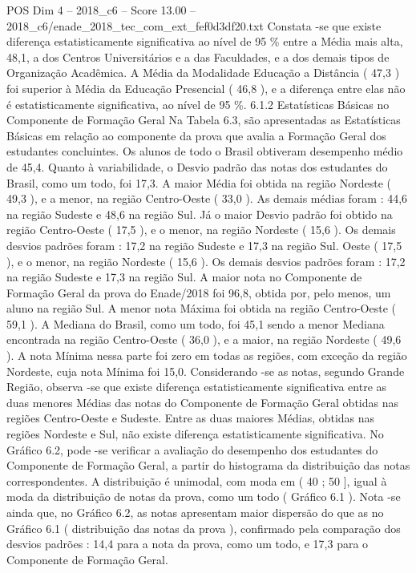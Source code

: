 \begin{textsample}{POS Dim 4 – 2018\_c6 – Score 13.00 – 2018\_c6/enade\_2018\_tec\_com\_ext\_fef0d3df20.txt}
Constata -se que existe diferença estatisticamente significativa ao nível de 95 \% entre a Média mais alta, 48,1, a dos Centros Universitários e a das Faculdades, e a dos demais tipos de Organização Acadêmica.
A Média da Modalidade Educação a Distância ( 47,3 ) foi superior à Média da Educação Presencial ( 46,8 ), e a diferença entre elas não é estatisticamente significativa, ao nível de 95 \%. 6.1.2 Estatísticas Básicas no Componente de Formação Geral Na Tabela 6.3, são apresentadas as Estatísticas Básicas em relação ao componente da prova que avalia a Formação Geral dos estudantes concluintes.
Os alunos de todo o Brasil obtiveram desempenho médio de 45,4.
Quanto à variabilidade, o Desvio padrão das notas dos estudantes do Brasil, como um todo, foi 17,3.
A maior Média foi obtida na região Nordeste ( 49,3 ), e a menor, na região Centro-Oeste ( 33,0 ).
As demais médias foram : 44,6 na região Sudeste e 48,6 na região Sul.
Já o maior Desvio padrão foi obtido na região Centro-Oeste ( 17,5 ), e o menor, na região Nordeste ( 15,6 ).
Os demais desvios padrões foram : 17,2 na região Sudeste e 17,3 na região Sul.
Oeste ( 17,5 ), e o menor, na região Nordeste ( 15,6 ).
Os demais desvios padrões foram : 17,2 na região Sudeste e 17,3 na região Sul.
A maior nota no Componente de Formação Geral da prova do Enade/2018 foi 96,8, obtida por, pelo menos, um aluno na região Sul.
A menor nota Máxima foi obtida na região Centro-Oeste ( 59,1 ).
A Mediana do Brasil, como um todo, foi 45,1 sendo a menor Mediana encontrada na região Centro-Oeste ( 36,0 ), e a maior, na região Nordeste ( 49,6 ).
A nota Mínima nessa parte foi zero em todas as regiões, com exceção da região Nordeste, cuja nota Mínima foi 15,0.
Considerando -se as notas, segundo Grande Região, observa -se que existe diferença estatisticamente significativa entre as duas menores Médias das notas do Componente de Formação Geral obtidas nas regiões Centro-Oeste e Sudeste.
Entre as duas maiores Médias, obtidas nas regiões Nordeste e Sul, não existe diferença estatisticamente significativa.
No Gráfico 6.2, pode -se verificar a avaliação do desempenho dos estudantes do Componente de Formação Geral, a partir do histograma da distribuição das notas correspondentes.
A distribuição é unimodal, com moda em ( 40 ; 50 ], igual à moda da distribuição de notas da prova, como um todo ( Gráfico 6.1 ).
Nota -se ainda que, no Gráfico 6.2, as notas apresentam maior dispersão do que as no Gráfico 6.1 ( distribuição das notas da prova ), confirmado pela comparação dos desvios padrões : 14,4 para a nota da prova, como um todo, e 17,3 para o Componente de Formação Geral.

\end{textsample}
